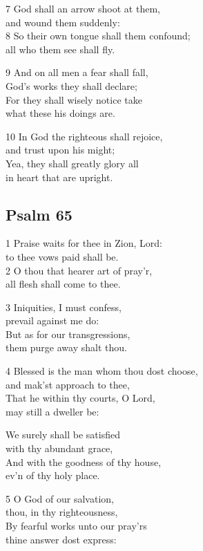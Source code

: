 \begin{multicols}{3}
7 God shall an arrow shoot at them,\\
and wound them suddenly:\\
8 So their own tongue shall them confound;\\
all who them see shall fly.

9 And on all men a fear shall fall,\\
God’s works they shall declare;\\
For they shall wisely notice take\\
what these his doings are.

10 In God the righteous shall rejoice,\\
and trust upon his might;\\
Yea, they shall greatly glory all\\
in heart that are upright.

\begin{center}
\quad{}\quad{}
\end{center}

\subsection*{Psalm 65}

1 Praise waits for thee in Zion, Lord:\\
to thee vows paid shall be.\\
2 O thou that hearer art of pray’r,\\
all flesh shall come to thee.

3 Iniquities, I must confess,\\
prevail against me do:\\
But as for our transgressions,\\
them purge away shalt thou.

4 Blessed is the man whom thou dost choose,\\
and mak’st approach to thee,\\
That he within thy courts, O Lord,\\
may still a dweller be:

We surely shall be satisfied\\
with thy abundant grace,\\
And with the goodness of thy house,\\
ev’n of thy holy place.

5 O God of our salvation,\\
thou, in thy righteousness,\\
By fearful works unto our pray’rs\\
thine answer dost express:


\end{multicols}
